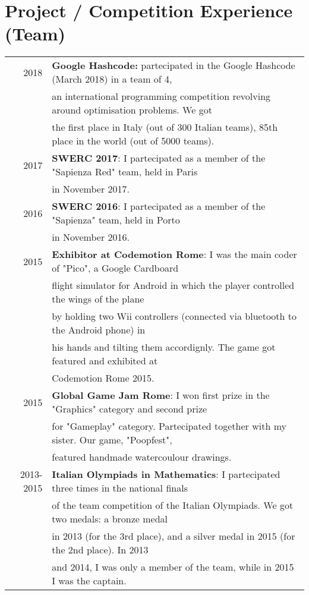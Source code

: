 \documentclass[a4paper,10pt]{article} %
\begin{document}
\section{Project / Competition Experience (Team)}
\begin{tabular}{rl}
2018 &  \textbf{Google Hashcode:} partecipated in the Google Hashcode (March 2018) in a team of 4,\\
     & an international programming competition revolving around optimisation problems. We got \\
     & the first place in Italy (out of 300 Italian teams), 85th place in the world (out of 5000 teams). \\
2017 &  \textbf{SWERC 2017}: I partecipated as a member of the "Sapienza Red" team, held in Paris\\
     & in November 2017.\\
2016 &  \textbf{SWERC 2016}: I partecipated as a member of the "Sapienza" team, held in Porto\\
     & in November 2016.\\
2015 &  \textbf{Exhibitor at Codemotion Rome}: I was the main coder of "Pico", a Google Cardboard \\
     & flight simulator for Android in which the player controlled the wings of the plane \\
     & by holding two Wii controllers (connected via bluetooth to the Android phone) in \\
     & his hands and tilting them accordignly. The game got featured and exhibited at \\
     & Codemotion Rome 2015.\\
2015 &  \textbf{Global Game Jam Rome}: I won first prize in the "Graphics" category and second prize \\
     & for "Gameplay" category. Partecipated together with my sister. Our game, "Poopfest",\\
     & featured handmade watercoulour drawings.\\
2013-2015 & \textbf{Italian Olympiads in Mathematics}: I partecipated three times in the national finals\\
     & of the team competition of the Italian Olympiads. We got two medals: a bronze medal \\
     & in 2013 (for the 3rd place), and a silver medal in 2015 (for the 2nd place). In 2013\\
     & and 2014, I was only a member of the team, while in 2015 I was the captain.\\

\end{tabular}
\end{document}
